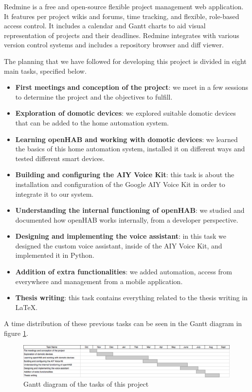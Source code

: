 Redmine is a free and open-source flexible project management web application. It features per project wikis and forums, time 
tracking, and flexible, role-based access control. It includes a calendar and Gantt charts to aid visual representation of projects 
and their deadlines. Redmine integrates with various version control systems and includes a repository browser and diff viewer.

The planning that we have followed for developing this project is divided in eight main tasks, specified below.
\begin{itemize}
	\item \textbf{First meetings and conception of the project}: we meet in a few sessions to determine the project and the 
	objectives to fulfill.
	\item \textbf{Exploration of domotic devices}: we explored suitable domotic devices that can be added to the home automation
	system.
	\item \textbf{Learning openHAB and working with domotic devices}: we learned the basics of this home automation system, installed
	it on different ways and tested different smart devices.
	\item \textbf{Building and configuring the AIY Voice Kit}: this task is about the installation and configuration of the Google 
	AIY Voice Kit in order to integrate it to our system.
	\item \textbf{Understanding the internal functioning of openHAB}: we studied and documented how openHAB works internally, from
	a developer perspective.
	\item \textbf{Designing and implementing the voice assistant}: in this task we designed the custom voice assistant, inside of 
	the AIY Voice Kit, and implemented it in Python.
	\item \textbf{Addition of extra functionalities}: we added automation, access from everywhere and management from a mobile 
	application.
	\item \textbf{Thesis writing}: this task contains everything related to the thesis writing in LaTeX.
\end{itemize}

A time distribution of these previous tasks can be seen in the Gantt diagram in figure \ref{fig:gantt}.

\begin{figure}
	\centering
	\includegraphics[width=1\textwidth]{images/Chapter_02/gantt.png}
	\caption{Gantt diagram of the tasks of this project}
	\label{fig:gantt}
\end{figure}

